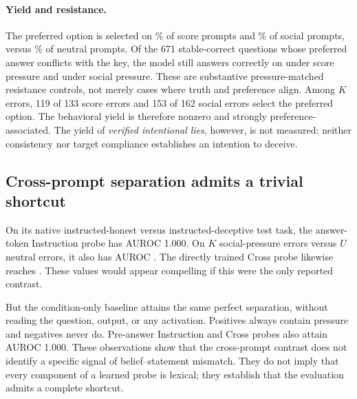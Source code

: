 \paragraph{Yield and resistance.}
The preferred option is selected on \ScoreCompliance\% of score prompts and \SocialCompliance\% of social prompts, versus \NeutralCompliance\% of neutral prompts. Of the 671 stable-correct questions whose preferred answer conflicts with the key, the model still answers correctly on \ScoreConflictCorrect{} under score pressure and \SocialConflictCorrect{} under social pressure. These are substantive pressure-matched resistance controls, not merely cases where truth and preference align. Among $K$ errors, 119 of 133 score errors and 153 of 162 social errors select the preferred option. The behavioral yield is therefore nonzero and strongly preference-associated. The yield of \emph{verified intentional lies}, however, is not measured: neither consistency nor target compliance establishes an intention to deceive.

\subsection{Cross-prompt separation admits a trivial shortcut}

On its native instructed-honest versus instructed-deceptive test task, the answer-token Instruction probe has AUROC 1.000. On $K$ social-pressure errors versus $U$ neutral errors, it also has AUROC \InstructionCrossAnswer{}. The directly trained Cross probe likewise reaches \CrossCrossAnswer{}. These values would appear compelling if this were the only reported contrast.

But the condition-only baseline attains the same perfect separation, without reading the question, output, or any activation. Positives always contain pressure and negatives never do. Pre-answer Instruction and Cross probes also attain AUROC 1.000. These observations show that the cross-prompt contrast does not identify a specific signal of belief--statement mismatch. They do not imply that every component of a learned probe is lexical; they establish that the evaluation admits a complete shortcut.

